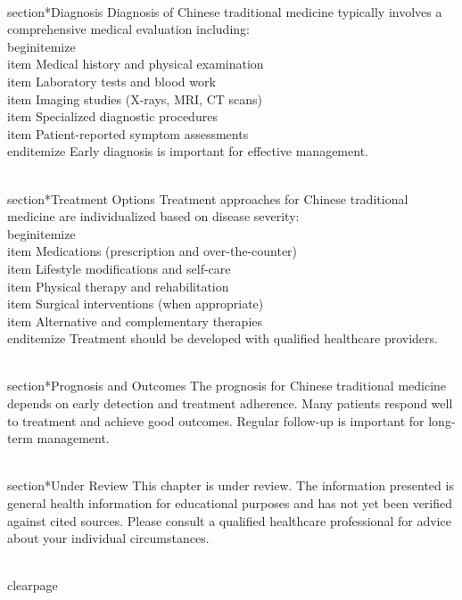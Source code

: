 \\section*{Diagnosis}
Diagnosis of Chinese traditional medicine typically involves a comprehensive medical evaluation including:
\\begin{itemize}
  \\item Medical history and physical examination
  \\item Laboratory tests and blood work
  \\item Imaging studies (X-rays, MRI, CT scans)
  \\item Specialized diagnostic procedures
  \\item Patient-reported symptom assessments
\\end{itemize}
Early diagnosis is important for effective management.

\\section*{Treatment Options}
Treatment approaches for Chinese traditional medicine are individualized based on disease severity:
\\begin{itemize}
  \\item Medications (prescription and over-the-counter)
  \\item Lifestyle modifications and self-care
  \\item Physical therapy and rehabilitation
  \\item Surgical interventions (when appropriate)
  \\item Alternative and complementary therapies
\\end{itemize}
Treatment should be developed with qualified healthcare providers.

\\section*{Prognosis and Outcomes}
The prognosis for Chinese traditional medicine depends on early detection and treatment adherence. Many patients respond well to treatment and achieve good outcomes. Regular follow-up is important for long-term management.

\\section*{Under Review}
This chapter is under review. The information presented is general health information for educational purposes and has not yet been verified against cited sources. Please consult a qualified healthcare professional for advice about your individual circumstances.

\\clearpage

